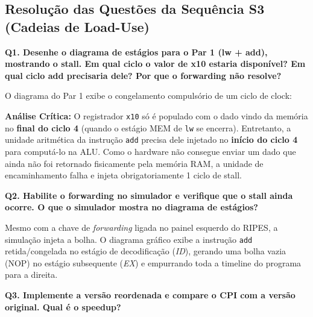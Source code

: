 \documentclass[12pt,a4paper]{article}
\begin{document}
\subsection{Resolução das Questões da Sequência S3 (Cadeias de Load-Use)}

\textbf{Q1. Desenhe o diagrama de estágios para o Par 1 (lw + add), mostrando o stall. Em qual ciclo o valor de x10 estaria disponível? Em qual ciclo add precisaria dele? Por que o forwarding não resolve?}

O diagrama do Par 1 exibe o congelamento compulsório de um ciclo de clock:
\begin{table}[H]
\centering
{}
\end{table}

\textbf{Análise Crítica:} O registrador \texttt{x10} só é populado com o dado vindo da memória no \textbf{final do ciclo 4} (quando o estágio MEM de \texttt{lw} se encerra). Entretanto, a unidade aritmética da instrução \texttt{add} precisa dele injetado no \textbf{início do ciclo 4} para computá-lo na ALU. Como o hardware não consegue enviar um dado que ainda não foi retornado fisicamente pela memória RAM, a unidade de encaminhamento falha e injeta obrigatoriamente 1 ciclo de stall.

\textbf{Q2. Habilite o forwarding no simulador e verifique que o stall ainda ocorre. O que o simulador mostra no diagrama de estágios?}

Mesmo com a chave de \textit{forwarding} ligada no painel esquerdo do RIPES, a simulação injeta a bolha. O diagrama gráfico exibe a instrução \texttt{add} retida/congelada no estágio de decodificação (\textit{ID}), gerando uma bolha vazia (NOP) no estágio subsequente (\textit{EX}) e empurrando toda a timeline do programa para a direita.

\textbf{Q3. Implemente a versão reordenada e compare o CPI com a versão original. Qual é o speedup?}
\end{document}
